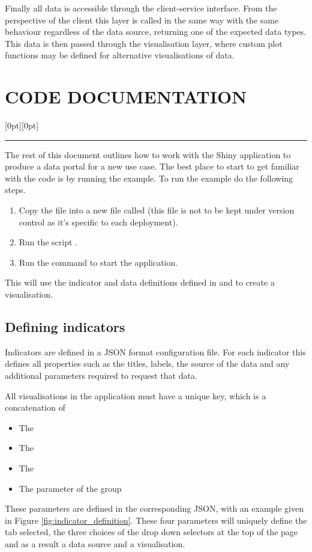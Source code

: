 \documentclass[12pt]{article}
\newcommand\statssection[1]{%
  \section*{\MakeUppercase{#1}}
  \raisebox{1.5em}[0pt][0pt]{\textcolor{statsorange}{\rule{0.2\textwidth}{6pt}}}
}
\begin{document}
Finally all data is accessible through the client-service interface.  From the perspective of the client this layer is called in the same way with the same behaviour regardless of the data source, returning one of the expected data types.  This data is then passed through the visualisation layer, where custom plot functions may be defined for alternative visualisations of data.

\newpage
\clearpage
\statssection{Code documentation}

The rest of this document outlines how to work with the Shiny application to produce a data portal for a new use case.  The best place to start to get familiar with the code is by running the example.  To run the example do the following steps.
\begin{enumerate}
\item Copy the file  into a new file called  (this file is not to be kept under version control as it's specific to each deployment).
\item Run the script .
\item Run the command  to start the application.
\end{enumerate}

This will use the indicator and data definitions defined in  and  to create a visualisation.


\subsection*{Defining indicators}

Indicators are defined in a JSON format configuration file.  For each indicator this defines all properties such as the titles, labels, the source of the data and any additional parameters required to request that data.

All visualisations in the application must have a unique key, which is a concatenation of
\begin{itemize}
\item The 
\item The 
\item The 
\item The  parameter of the group
\end{itemize}
These parameters are defined in the corresponding JSON, with an example given in Figure \ref{fig:indicator_definition}.  These four parameters will uniquely define the tab selected, the three choices of the drop down selectors at the top of the page and as a result a data source and a visualisation.
\end{document}
